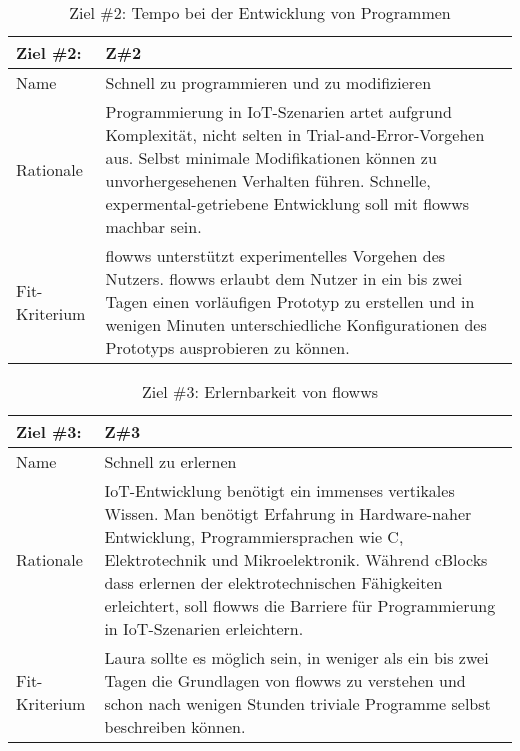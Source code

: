 \begin{table}[H]
\caption{Ziel \#2: Tempo bei der Entwicklung von Programmen}
\label{tab:ziel2}
\begin{tabularx}{\textwidth}{lX}
\hline
\rowcolor[HTML]{EFEFEF} 
Ziel \#2:     & Z\#2 \\ \hline
Name          & Schnell zu programmieren und zu modifizieren\\ \hline
Rationale     & Programmierung in IoT-Szenarien artet aufgrund Komplexität, nicht selten in Trial-and-Error-Vorgehen aus. Selbst minimale Modifikationen können zu unvorhergesehenen Verhalten führen. Schnelle, expermental-getriebene Entwicklung soll mit flowws machbar sein.\\ \hline
Fit-Kriterium & flowws unterstützt experimentelles Vorgehen des Nutzers. flowws erlaubt dem Nutzer in ein bis zwei Tagen einen vorläufigen Prototyp zu erstellen und in wenigen Minuten unterschiedliche Konfigurationen des Prototyps ausprobieren zu können. \\ \hline
\end{tabularx}
\end{table}

\begin{table}[H]
\caption{Ziel \#3: Erlernbarkeit von flowws}
\label{tab:ziel1}
\begin{tabularx}{\textwidth}{lX}
\hline
\rowcolor[HTML]{EFEFEF} 
Ziel \#3:     & Z\#3   \\ \hline
Name          & Schnell zu erlernen \\ \hline
Rationale     & IoT-Entwicklung benötigt ein immenses vertikales Wissen. Man benötigt Erfahrung in Hardware-naher Entwicklung, Programmiersprachen wie C, Elektrotechnik und Mikroelektronik. Während cBlocks dass erlernen der elektrotechnischen Fähigkeiten erleichtert, soll flowws die Barriere für Programmierung in IoT-Szenarien erleichtern. \\ \hline
Fit-Kriterium & Laura sollte es möglich sein, in weniger als ein bis zwei Tagen die Grundlagen von flowws zu verstehen und schon nach wenigen Stunden triviale Programme selbst beschreiben können. \\ \hline
\end{tabularx}
\end{table}




